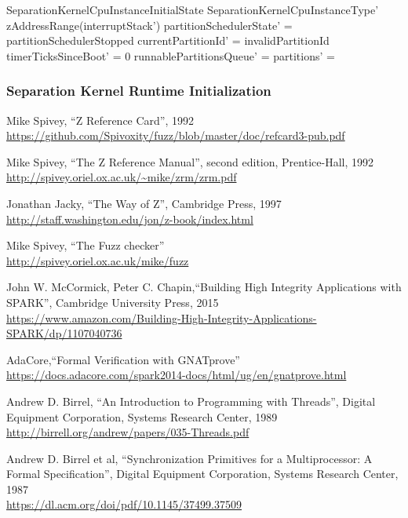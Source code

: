 \documentclass[11pt,letterpaper,twoside,openany]{book}
\begin{document}
\begin{schema}{SeparationKernelCpuInstanceInitialState}
   SeparationKernelCpuInstanceType'
\where
   zAddressRange(interruptStack') \neq \emptyset
\also
    partitionSchedulerState' = partitionSchedulerStopped
\also
   currentPartitionId' = invalidPartitionId
\also
   timerTicksSinceBoot' = 0
\also
   runnablePartitionsQueue' = \langle \rangle
\also
   partitions' = \emptyset
\end{schema}

\subsubsection{Separation Kernel Runtime Initialization}


\begin{thebibliography}{9}

Mike Spivey, ``Z Reference Card'', 1992 \\
\url{https://github.com/Spivoxity/fuzz/blob/master/doc/refcard3-pub.pdf}

Mike Spivey, ``The Z Reference Manual'', second edition, Prentice-Hall, 1992 \\
\url{http://spivey.oriel.ox.ac.uk/~mike/zrm/zrm.pdf}

Jonathan Jacky, ``The Way of Z'', Cambridge Press, 1997 \\
\url{http://staff.washington.edu/jon/z-book/index.html}

Mike Spivey, ``The Fuzz checker'' \\
\url{http://spivey.oriel.ox.ac.uk/mike/fuzz}

John W. McCormick, Peter C. Chapin,``Building High Integrity Applications with SPARK'', Cambridge University Press, 2015 \\
\url{https://www.amazon.com/Building-High-Integrity-Applications-SPARK/dp/1107040736}

AdaCore,``Formal Verification with GNATprove'' \\
\url{https://docs.adacore.com/spark2014-docs/html/ug/en/gnatprove.html}

Andrew D. Birrel, ``An Introduction to Programming with Threads'',
Digital Equipment Corporation, Systems Research Center, 1989 \\
\url{http://birrell.org/andrew/papers/035-Threads.pdf}

Andrew D. Birrel et al, ``Synchronization Primitives for a Multiprocessor: A Formal Specification'',
Digital Equipment Corporation, Systems Research Center, 1987 \\
\url{https://dl.acm.org/doi/pdf/10.1145/37499.37509}


\end{thebibliography}
\end{document}
